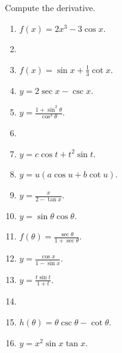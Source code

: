
Compute the derivative.
\begin{multicols}{2}
\begin{enumerate}
\item $\displaystyle f(x)= 2x^3 -3 \cos x$.

\item 

\item $\displaystyle f(x)=\sin x +\frac{1}{3}\cot x$.

\item $\displaystyle y=2\sec x - \csc x$.

\item $\displaystyle y=\frac{1+\sin^2\theta}{\cos^3\theta}$.

\item 
\item $\displaystyle y= c\cos t + t^2\sin t$.

\item $\displaystyle y=u(a\cos u + b \cot u)$.

\item $\displaystyle y=\frac{x}{2-\tan x}$.

\item $\displaystyle y=\sin \theta \cos \theta$.

\answer{$\cos (2\theta)= \cos^2\theta- \sin^2\theta$}
\item $\displaystyle f(\theta)=\frac{\sec \theta}{1+\sec \theta}$.

\item $\displaystyle y=\frac{\cos x}{1-\sin x}$.

\item $\displaystyle y=\frac{t\sin t}{1+t}$.

\item 

\item $\displaystyle h(\theta)=\theta \csc \theta -\cot \theta$.

\item $\displaystyle y=x^2\sin x\tan x$.

\end{enumerate}
\end{multicols}
